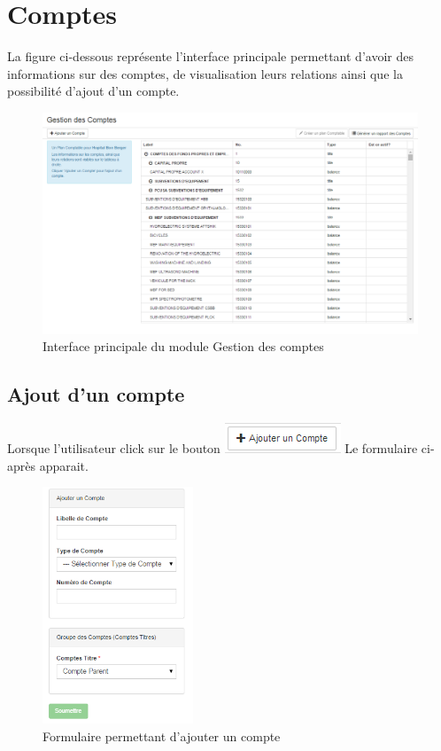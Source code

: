 \documentclass[12pt,a4paper]{report}
\begin{document}
\section{Comptes}
La figure ci-dessous représente l'interface principale permettant d'avoir des informations sur des comptes, de visualisation  leurs relations ainsi que la possibilité d'ajout d'un compte.

\begin{figure}[h]
\begin{center}
\includegraphics[width=13cm]{pic/GestionCompte.png}
\end{center}
\caption{Interface principale du module Gestion des comptes}
\label{Interface principale du module Gestion des comptes}
\end{figure}

\subsection{Ajout d'un compte}
Lorsque l'utilisateur click sur le bouton \includegraphics[scale=1]{pic/AjouterCompte.png} Le formulaire ci-après apparait.

\begin{figure}[h]
\begin{center}
\includegraphics[width=4.5cm]{pic/FormAddCompte.png}
\end{center}
\caption{Formulaire permettant d'ajouter un compte}
\label{Formulaire permettant d'ajouter un compte}
\end{figure}
\end{document}
